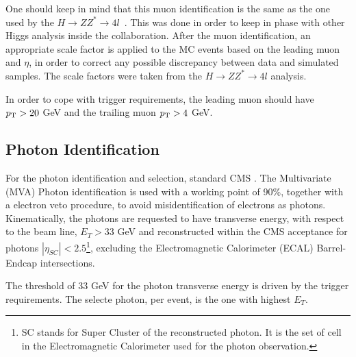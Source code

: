 





One should keep in mind that this muon identification is the same as the one used by the $H \rightarrow ZZ^{*} \rightarrow 4l$~\cite{higgs_zz_4l_papper}. This was done in order to keep in phase with other Higgs analysis inside the collaboration. After the muon identification, an appropriate scale factor is applied to the MC events based on the leading muon \PT and $\eta$, in order to correct any possible discrepancy between data and simulated samples. The scale factors were taken from the $H \rightarrow ZZ^{*} \rightarrow 4l$ analysis.

In order to cope with trigger requirements, the leading muon should have $p_{\mathrm{T}} > 20$ GeV and the trailing muon $p_{\mathrm{T}} > 4$ GeV.


\subsection{Photon Identification}
\label{sec:photon_id}

For the photon identification and selection, standard CMS . The Multivariate (MVA) Photon identification is used with a working point of 90\%, together with a electron veto procedure, to avoid misidentification of electrons as photons. Kinematically, the photons are requested to have transverse energy, with respect to the beam line, $E_{T} > 33$ GeV and reconstructed within the CMS acceptance for photons $|\eta_{SC}| < 2.5$\footnote{SC stands for Super Cluster of the reconstructed photon. It is the set of cell in the Electromagnetic Calorimeter used for the photon observation.}, excluding the Electromagnetic Calorimeter (ECAL) Barrel-Endcap intersections.

The threshold of 33 GeV for the photon transverse energy is driven by the trigger requirements. The selecte photon, per event, is the one with highest $E_{T}$.


